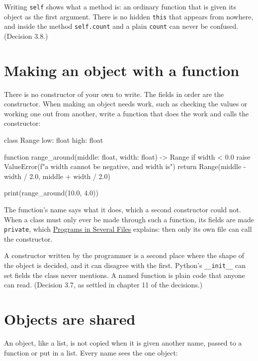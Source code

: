 \begin{why}
Writing \verb|self| shows what a method is: an ordinary function that
is given its object as the first argument. There is no hidden
\verb|this| that appears from nowhere, and inside the method
\verb|self.count| and a plain \verb|count| can never be confused.
(Decision 3.8.)
\end{why}

\section{Making an object with a function}

There is no constructor of your own to write. The fields in order are
the constructor. When making an object needs work, such as checking
the values or working one out from another, write a function that does
the work and calls the constructor:

\begin{zeno}
class Range {
    low: float
    high: float
}

function range_around(middle: float, width: float) -> Range {
    if width < 0.0 {
        raise ValueError(f"a width cannot be negative, and {width} is")
    }
    return Range(middle - width / 2.0, middle + width / 2.0)
}

print(range_around(10.0, 4.0))
\end{zeno}

The function's name says what it does, which a second constructor
could not. When a class must only ever be made through such a
function, its fields are made \verb|private|, which
\hyperref[ch-modules]{Programs in Several Files} explains: then only
its own file can call the constructor.

\begin{why}
A constructor written by the programmer is a second place where the
shape of the object is decided, and it can disagree with the first.
Python's \verb|__init__| can set fields the class never mentions.
A named function is plain code that anyone can read. (Decision 3.7, as
settled in chapter 11 of the decisions.)
\end{why}

\section{Objects are shared}

An object, like a list, is not copied when it is given another name,
passed to a function or put in a list. Every name sees the one object:

